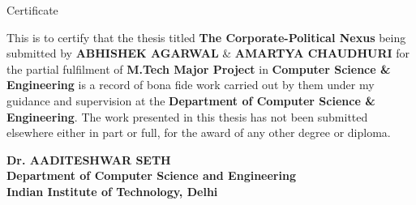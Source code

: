 \begin{center}
\LARGE{ Certificate} 
\end{center}

\vspace{0.5in}

This is to certify that the thesis titled {\bfseries The Corporate-Political Nexus} being submitted by
{\bfseries ABHISHEK AGARWAL} \& {\bfseries AMARTYA CHAUDHURI} for the partial fulfilment of {\bfseries M.Tech Major Project} in {\bfseries Computer Science \& Engineering} is a record of bona fide work carried out by them under my guidance and supervision at the {\bfseries Department of Computer Science \& Engineering}. The work presented in this thesis has not been submitted elsewhere either in part or full, for the award of any other degree or diploma.

\vspace{1.5in}


{\bfseries Dr. AADITESHWAR SETH} \\
{\bfseries Department of Computer Science and Engineering} \\
{\bfseries Indian Institute of Technology, Delhi}\\ 
